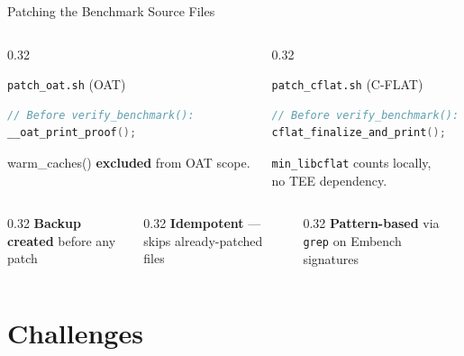 \documentclass[aspectratio=169, 10pt]{beamer}
\begin{document}
\begin{frame}[fragile]{Patching the Benchmark Source Files}
\begin{columns}[T]
\begin{column}{0.32\textwidth}
\begin{warnbox}{\texttt{patch\_oat.sh} (OAT)}
\begin{lstlisting}[style=cstyle, language=C]
// Before verify_benchmark():
__oat_print_proof();
                \end{lstlisting}
                \tiny warm\_caches() \textbf{excluded} from OAT scope.
            \end{warnbox}
        \end{column}
        \begin{column}{0.32\textwidth}
            \begin{greenbox}{\texttt{patch\_cflat.sh} (C-FLAT)}
                \begin{lstlisting}[style=cstyle, language=C]
// Before verify_benchmark():
cflat_finalize_and_print();
                \end{lstlisting}
                \tiny \texttt{min\_libcflat} counts locally,\\no TEE dependency.
            \end{greenbox}
        \end{column}
    \end{columns}
    \vspace{8pt}
    \begin{columns}[T]
        \begin{column}{0.32\textwidth}
            \centering\scriptsize
            \textcolor{droneblue}{\textbf{Backup created}} before any patch
        \end{column}
        \begin{column}{0.32\textwidth}
            \centering\scriptsize
            \textcolor{droneblue}{\textbf{Idempotent}} --- skips already-patched files
        \end{column}
        \begin{column}{0.32\textwidth}
            \centering\scriptsize
            \textcolor{droneblue}{\textbf{Pattern-based}} via \texttt{grep} on Embench signatures
        \end{column}
    \end{columns}
\end{frame}

\section{Challenges}
\end{document}
